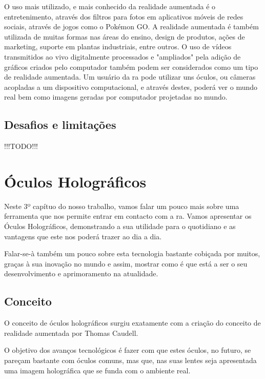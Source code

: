 \documentclass{report}
\begin{document}
O uso mais utilizado, e mais conhecido da realidade aumentada é o entretenimento, através dos filtros para fotos em aplicativos móveis de redes sociais, através de jogos como o Pokémon GO. A realidade aumentada é também utilizada de muitas formas nas áreas do ensino, design de produtos, ações de marketing, suporte em plantas industriais, entre outros. O uso de vídeos transmitidos ao vivo digitalmente processados e "ampliados" pela adição de gráficos criados pelo computador também podem ser considerados como um tipo de realidade aumentada. Um usuário da \ac{ra} pode utilizar uns óculos, ou câmeras acopladas a um dispositivo computacional, e através destes, poderá ver o mundo real bem como imagens geradas por computador projetadas no mundo.


\section{Desafios e limitações}
!!!TODO!!!

\chapter{Óculos Holográficos}
\label{chap.oculos-holograficos}
Neste 3º capítuo do nosso trabalho, vamos falar um pouco mais sobre uma ferramenta que nos permite entrar em contacto com a \ac{ra}. Vamos apresentar os Óculos Holográficos, demonstrando a sua utilidade para o quotidiano e as vantagens que este nos poderá trazer ao dia a dia. 

Falar-se-à também um pouco sobre esta tecnologia bastante cobiçada por muitos, graças à sua inovação no mundo e assim, mostrar como é que está a ser o seu desenvolvimento e aprimoramento na atualidade.

\section{Conceito}
O conceito de óculos holográficos surgiu exatamente com a criação do conceito de realidade aumentada por Thomas Caudell.

O objetivo dos avanços tecnológicos é fazer com que estes óculos, no futuro, se pareçam bastante com óculos comuns, mas que, nas suas lentes seja apresentada uma
imagem holográfica que se funda com o ambiente real.
\end{document}
